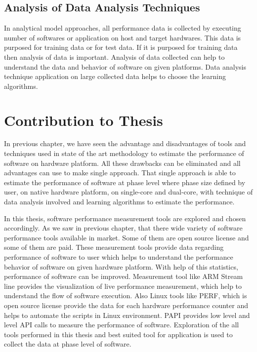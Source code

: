 \subsection{Analysis of Data Analysis Techniques}
In analytical model approaches, all performance data is collected by executing number of softwares or application on host and target hardwares. This data is purposed for training data or for test data. If it is purposed for training data then analysis of data is important. Analysis of data collected can help to understand the data and behavior of software on given platforms. Data analysis technique application on large collected data helps to choose the learning algorithms. 


\section{Contribution to Thesis}
In previous chapter, we have seen the advantage and disadvantages of tools and techniques used in state of the art methodology to estimate the performance of software on hardware platform. All these drawbacks can be eliminated and all advantages can use to make single approach. That single approach is able to estimate the performance of software at phase level where phase size defined by user, on native hardware platform, on single-core and dual-core, with technique of data analysis involved and learning algorithms to estimate the performance. 

\par In this thesis, software performance measurement tools are explored and chosen accordingly. As we saw in previous chapter, that there wide variety of software performance tools available in market. Some of them are open source license and some of them are paid. These measurement tools provide data regarding performance of software to user which helps to understand the performance behavior of software on given hardware platform. With help of this statistics, performance of software can be improved. Measurement tool like ARM Stream line provides the visualization of live performance measurement, which help to understand the flow of software execution. Also Linux tools like PERF, which is open source license provide the data for each hardware performance counter and helps to automate the scripts in Linux environment. PAPI provides low level and level API calls to measure the performance of software. Exploration of the all tools performed in this thesis and best suited tool for application is used to collect the data at phase level of software.

